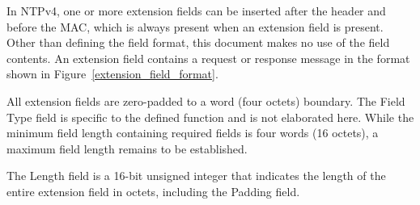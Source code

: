 In NTPv4, one or more extension fields can be inserted after the
header and before the MAC, which is always present when an extension
field is present. Other than defining the field format, this
document makes no use of the field contents. An extension field
contains a request or response message in the format shown in
Figure~\ref{extension_field_format}.


All extension fields are zero-padded to a word (four octets)
boundary. The Field Type field is specific to the defined function
and is not elaborated here. While the minimum field length
containing required fields is four words (16 octets), a maximum field
length remains to be established.

The Length field is a 16-bit unsigned integer that indicates the
length of the entire extension field in octets, including the Padding
field.
